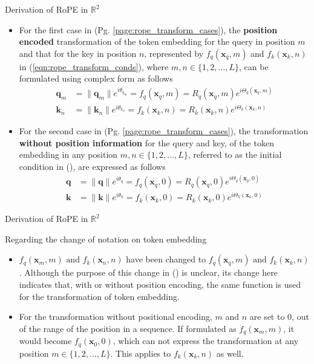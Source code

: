 \documentclass{beamer}
\begin{document}
	\begin{frame}{Derivation of RoPE in $\mathbb{R}^2$}	
		\begin{itemize}
			\item For the first case in (Pg. \ref{page:rope_transform_cases}), the \textbf{position encoded} transformation of the token embedding for the query in position $m$ and that for the key in position $n$, represented by $f_q(\mathbf{x}_q, m)$ and $f_k(\mathbf{x}_k, n)$ in  (\ref{eqn:rope_transform_conds}), where $m,n \in \{1,2,...,L\}$, can be formulated using complex form as follows
			\begin{align} 
				\mathbf{q}_m &= \|\mathbf{q}_m\|e^{i\theta_{q_m}} = f_q(\mathbf{x}_q, m) = R_q(\mathbf{x}_q, m)e^{i\Theta_q(\mathbf{x}_q, m)} \label{eqn:rope_transform_complex_q} \\ 
				\mathbf{k}_n &= \|\mathbf{k}_n\|e^{i\theta_{k_n}} = f_k(\mathbf{x}_k, n) = R_k(\mathbf{x}_k, n)e^{i\Theta_k(\mathbf{x}_k, n)} \label{eqn:rope_transform_complex_k}
			\end{align}
			\item For the second case in (Pg. \ref{page:rope_transform_cases}), the transformation \textbf{without position information} for the query and key, of the token embedding in any position $m,n\in\{1,2,...,L\}$, referred to as the initial condition in (\cite{su2023roformerenhancedtransformerrotary}), are expressed as follows
			\begin{align} 
				\mathbf{q} &= \|\mathbf{q}\|e^{i\theta_q} = f_q(\mathbf{x}_q, 0) = R_q(\mathbf{x}_q, 0)e^{i\Theta_q(\mathbf{x}_q, 0)} \label{eqn:rope_transform_wo_posenc_complex_p} \\ 
				\mathbf{k} &= \|\mathbf{k}\|e^{i\theta_k} = f_k(\mathbf{x}_k, 0) = R_k(\mathbf{x}_k, 0)e^{i\Theta_k(\mathbf{x}_k, 0)} \label{eqn:rope_transform_wo_posenc_complex_k}
			\end{align}						
		\end{itemize}
	\end{frame}
	
	\begin{frame}{Derivation of RoPE in $\mathbb{R}^2$}	
		\begin{block}{Regarding the change of notation on token embedding}
			\begin{itemize}
				\item $f_q(\mathbf{x}_m, m) \text{ and } f_k(\mathbf{x}_n, n)$ have been changed to $f_q(\mathbf{x}_q, m) \text{ and } f_k(\mathbf{x}_k, n)$. Although the purpose of this change in (\cite{su2023roformerenhancedtransformerrotary}) is unclear, its change here indicates that, with or without position encoding, the same function is used for the transformation of token embedding. 
				\item For the transformation without positional encoding, $m$ and $n$ are set to $0$, out of the range of the position in a sequence. If formulated as $f_q(\mathbf{x}_m, m)$, it would become $f_q(\mathbf{x}_0, 0)$, which can not express the transformation at any position $m\in\{1,2,...,L\}$. This applies to $f_k(\mathbf{x}_k, n)$ as well.				
			\end{itemize}
		\end{block}
	\end{frame}
	
\end{document}
